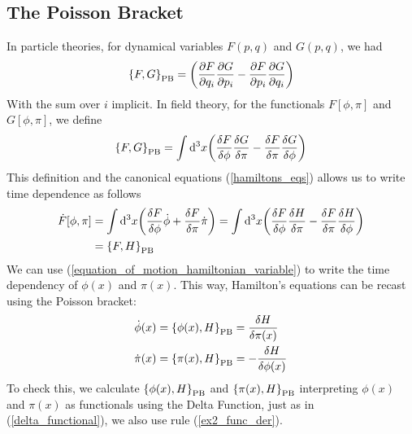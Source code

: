  \subsection{The Poisson Bracket}
  In particle theories, for dynamical variables $F(p,q)$ and $G(p,q)$, we had
 \begin{equation}
     \poissonbracket{F}{G}_{\text{PB}}=\qty(\pdv{F}{q_i}\pdv{G}{p_i}-\pdv{F}{p_i}\pdv{G}{q_i})
     \label{poisson_bracket}
 \end{equation}
With the sum over $i$ implicit. In field theory, for the functionals $F[\phi,\pi]$ and $G[\phi,\pi]$, we define
 \begin{equation}
      \poissonbracket{F}{G}_{\text{PB}}=\int\dd^3x\qty(\fdv{F}{\phi}\fdv{G}{\pi}-\fdv{F}{\pi}\fdv{G}{\phi})
 \end{equation}
This  definition and the canonical equations (\ref{hamiltons_eqs}) allows us to write time dependence as follows
\begin{equation}
\begin{aligned}
         \dot{F}[\phi,\pi]&=\int\dd^3x\qty(\fdv{F}{\phi}\dot{\phi}+\fdv{F}{\pi}\dot{\pi})=\int\dd^3x\qty(\fdv{F}{\phi}\fdv{H}{\pi}-\fdv{F}{\pi}\fdv{H}{\phi})\\
         &=\poissonbracket{F}{H}_{\text{PB}}
\end{aligned}
    \label{equation_of_motion_hamiltonian_variable}
\end{equation}
We can use (\ref{equation_of_motion_hamiltonian_variable}) to write the time dependency of $\phi(x)$ and $\pi(x)$. This way, Hamilton's equations can be recast using the Poisson bracket:
\begin{equation}
\begin{aligned}
    \dot{\phi}(x)&=\poissonbracket{\phi(x)}{H}_{\text{PB}}=\fdv{H}{\pi(x)}\\
    \dot{\pi}(x)&=\poissonbracket{\pi(x)}{H}_{\text{PB}}=-\fdv{H}{\phi(x)}
\end{aligned}
\end{equation}
 To check this, we calculate $\poissonbracket{\phi(x)}{H}_{\text{PB}}$ and $\poissonbracket{\pi(x)}{H}_{\text{PB}}$ interpreting $\phi(x)$ and $\pi(x)$ as functionals using the Delta Function, just as in (\ref{delta_functional}), we also use rule (\ref{ex2_func_der}).\\
 
